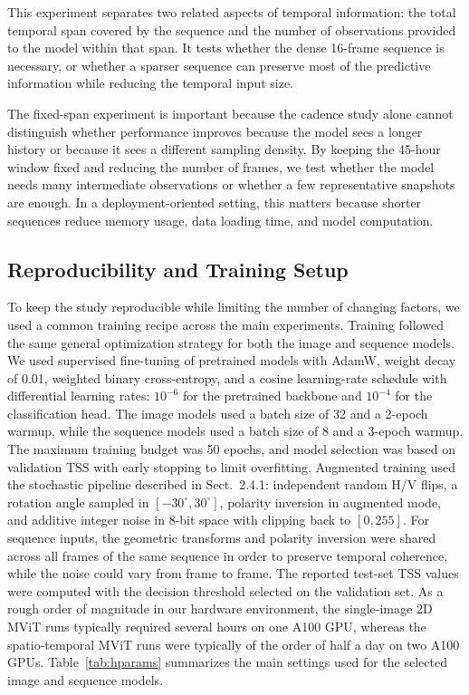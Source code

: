 This experiment separates two related aspects of temporal information: the total temporal span covered by the sequence and the number of observations provided to the model within that span. It tests whether the dense 16-frame sequence is necessary, or whether a sparser sequence can preserve most of the predictive information while reducing the temporal input size.

The fixed-span experiment is important because the cadence study alone cannot distinguish whether performance improves because the model sees a longer history or because it sees a different sampling density. By keeping the 45-hour window fixed and reducing the number of frames, we test whether the model needs many intermediate observations or whether a few representative snapshots are enough. In a deployment-oriented setting, this matters because shorter sequences reduce memory usage, data loading time, and model computation.

\subsection{Reproducibility and Training Setup}
\label{sec:repro}

To keep the study reproducible while limiting the number of changing factors, we used a common training recipe across the main experiments. Training followed the same general optimization strategy for both the image and sequence models. We used supervised fine-tuning of pretrained models with AdamW, weight decay of 0.01, weighted binary cross-entropy, and a cosine learning-rate schedule with differential learning rates: $10^{-6}$ for the pretrained backbone and $10^{-4}$ for the classification head. The image models used a batch size of 32 and a 2-epoch warmup, while the sequence models used a batch size of 8 and a 3-epoch warmup. The maximum training budget was 50 epochs, and model selection was based on validation TSS with early stopping to limit overfitting. Augmented training used the stochastic pipeline described in Sect.~2.4.1: independent random H/V flips, a rotation angle sampled in $[-30^\circ,30^\circ]$, polarity inversion in augmented mode, and additive integer noise in 8-bit space with clipping back to $[0,255]$. For sequence inputs, the geometric transforms and polarity inversion were shared across all frames of the same sequence in order to preserve temporal coherence, while the noise could vary from frame to frame. The reported test-set TSS values were computed with the decision threshold selected on the validation set. As a rough order of magnitude in our hardware environment, the single-image 2D MViT runs typically required several hours on one A100 GPU, whereas the spatio-temporal MViT runs were typically of the order of half a day on two A100 GPUs. Table~\ref{tab:hparams} summarizes the main settings used for the selected image and sequence models.

